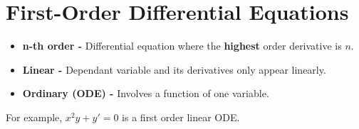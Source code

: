 \documentclass[../main.tex]{subfiles}
\begin{document}
\chapter{First-Order Differential Equations}
\begin{remark}[Terminology]
  \begin{itemize}
    \item \textbf{n-th order - } Differential equation where the \textbf{highest} order derivative is $n$.
    \item \textbf{Linear -} Dependant variable and its derivatives only appear linearly.
    \item \textbf{Ordinary (ODE) -} Involves a function of one variable.
  \end{itemize}
  For example, $x^2y + y' = 0$ is a first order linear ODE.
\end{remark}
\end{document}
